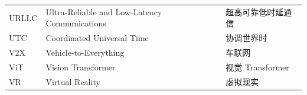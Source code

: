\begin{abbreviation}
\begin{longtable}{@{} p{} p{} p{} @{}}
  URLLC     & Ultra-Reliable and Low-Latency Communications                  & 超高可靠低时延通信            \\
  UTC       & Coordinated Universal Time                                      & 协调世界时                    \\
  V2X       & Vehicle-to-Everything                                           & 车联网                        \\
  ViT       & Vision Transformer                                              & 视觉 Transformer              \\
  VR        & Virtual Reality                                                 & 虚拟现实                      \\
\end{longtable}

\end{abbreviation}
